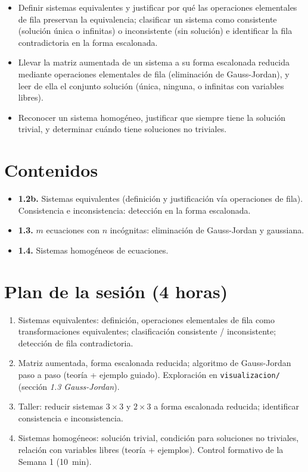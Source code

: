 \documentclass[11pt,letterpaper]{article}
\begin{document}
\begin{itemize}[leftmargin=1.2cm]
  \item[\textbf{RA1.2b.}] Definir sistemas equivalentes y justificar por qué las operaciones
        elementales de fila preservan la equivalencia; clasificar un sistema como consistente
        (solución única o infinitas) o inconsistente (sin solución) e identificar la fila
        contradictoria en la forma escalonada.
  \item[\textbf{RA1.3.}] Llevar la matriz aumentada de un sistema a su forma escalonada
        reducida mediante operaciones elementales de fila (eliminación de Gauss-Jordan), y leer
        de ella el conjunto solución (única, ninguna, o infinitas con variables libres).
  \item[\textbf{RA1.4.}] Reconocer un sistema homogéneo, justificar que siempre tiene la solución
        trivial, y determinar cuándo tiene soluciones no triviales.
\end{itemize}

\section{Contenidos}

\begin{itemize}[leftmargin=1.2cm]
  \item \textbf{1.2b.} Sistemas equivalentes (definición y justificación vía operaciones de
        fila). Consistencia e inconsistencia: detección en la forma escalonada.
  \item \textbf{1.3.} $m$ ecuaciones con $n$ incógnitas: eliminación de Gauss-Jordan y gaussiana.
  \item \textbf{1.4.} Sistemas homogéneos de ecuaciones.
\end{itemize}

\section{Plan de la sesión (4 horas)}

\begin{enumerate}[leftmargin=1.2cm]
  \item[\textbf{Hora 1.}] Sistemas equivalentes: definición, operaciones elementales de fila
        como transformaciones equivalentes; clasificación consistente / inconsistente; detección
        de fila contradictoria.
  \item[\textbf{Hora 2.}] Matriz aumentada, forma escalonada reducida; algoritmo de Gauss-Jordan
        paso a paso (teoría + ejemplo guiado). Exploración en \texttt{visualizacion/} (sección
        \emph{1.3 Gauss-Jordan}).
  \item[\textbf{Hora 3.}] Taller: reducir sistemas $3\times 3$ y $2\times 3$ a forma escalonada
        reducida; identificar consistencia e inconsistencia.
  \item[\textbf{Hora 4.}] Sistemas homogéneos: solución trivial, condición para soluciones no
        triviales, relación con variables libres (teoría + ejemplos). Control formativo de la
        Semana 1 (10~min).
\end{enumerate}
\end{document}
